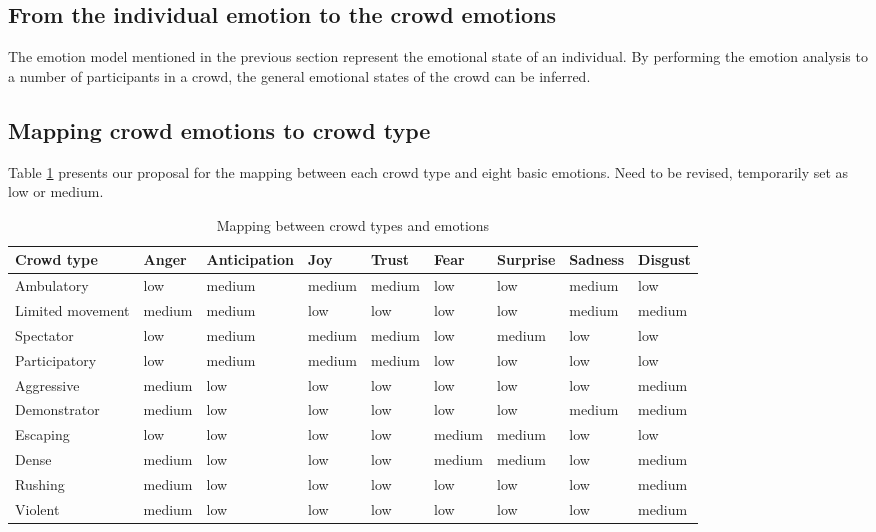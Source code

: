 \subsection{From the individual emotion to the crowd emotions}
The emotion model mentioned in the previous section represent the emotional state of an individual. By performing the emotion analysis to a number of participants in a crowd, the general emotional states of the crowd can be inferred.

\subsection{Mapping crowd emotions to crowd type}
Table \ref{table:mappingEmotionCrowdType} presents our proposal for the mapping between each crowd type and eight basic emotions. Need to be revised, temporarily set as low or medium.

\begin{table}
\caption{Mapping between crowd types and emotions}
\label{table:mappingEmotionCrowdType}
\begin{tabular}{|p{2cm}|p{1.2cm}|p{1.2cm}|p{1.2cm}|p{1.2cm}|p{1.2cm}|p{1.2cm}|p{1.2cm}|p{1.2cm}|}
\hline
\textbf{Crowd type}	& \textbf{Anger}	& \textbf{Anticipation}	& \textbf{Joy} 	& \textbf{Trust}	& \textbf{Fear}	& \textbf{Surprise}	& \textbf{Sadness}	& \textbf{Disgust}	\\
\hline
Ambulatory			& low 				& medium				& medium		& medium			& low 			& low 				& medium			& low 		\\
\hline
Limited movement	& medium			& medium				& low 			& low 				& low 			& low 				& medium			& medium	\\
\hline
Spectator			& low 				& medium				& medium		& medium 			& low 			& medium			& low 				& low 		\\
\hline
Participatory		& low 				& medium				& medium		& medium			& low 			& low 				& low 				& low 		\\
\hline
Aggressive			& medium			& low 					& low 			& low 				& low 			& low 				& low 				& medium	\\
\hline
Demonstrator		& medium			& low 					& low 			& low 				& low 			& low 				& medium			& medium	\\
\hline
Escaping			& low 				& low 					& low 			& low 				& medium		& medium			& low 				& low 		\\
\hline
Dense				& medium			& low 					& low 			& low 				& medium		& medium			& low 				& medium	\\
\hline
Rushing				& medium			& low 					& low 			& low 				& low 			& low 				& low 				& medium	\\
\hline
Violent				& medium			& low 					& low 			& low 				& low 			& low 				& low 				& medium	\\
\hline
\end{tabular}
\end{table}

